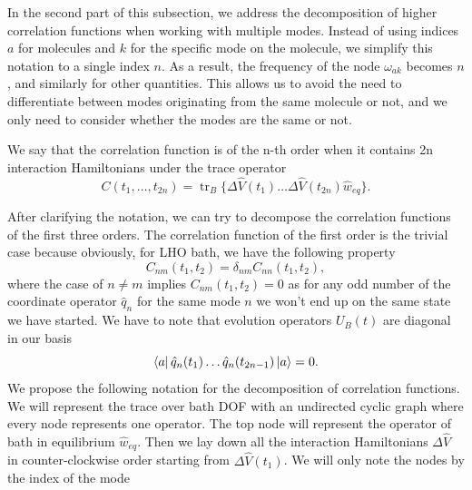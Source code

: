 In the second part of this subsection, we address the decomposition of higher correlation functions when working with multiple modes. Instead of using indices $a$ for molecules and $k$ for the specific mode on the molecule, we simplify this notation to a single index $n$. As a result, the frequency of the node $\omega_{ak}$ becomes $n$, and similarly for other quantities. This allows us to avoid the need to differentiate between modes originating from the same molecule or not, and we only need to consider whether the modes are the same or not. 


We say that the correlation function is of the n-th order when it contains 2n interaction Hamiltonians under the trace operator
\begin{equation}
    C(t_1, \ldots, t_{2n}) = \operatorname{tr}_B \big\{ \Delta \hat{V} (t_1) \ldots \Delta \hat{V} (t_{2n}) \hat{w}_{eq} \big\}.
\end{equation}

After clarifying the notation, we can try to decompose the correlation functions of the first three orders. The correlation function of the first order is the trivial case because obviously, for LHO bath, we have the following property
\begin{equation}
\label{corr_fun_1st_decompshow}
    C_{nm}(t_1, t_2) = \delta_{nm}C_{nn}(t_1, t_2),
\end{equation}
where the case of $n\neq m$ implies $C_{nm}(t_1, t_2) = 0$ as for any odd number of the coordinate operator $\hat{q}_n$ for the same mode $n$ we won't end up on the same state we have started. We have to note that evolution operators $U_B(t)$ are diagonal in our basis
\begin{equation}
    \bra{a} \hat{q}_n(t_1) \ldots \hat{q}_n(t_{2n-1}) \ket{a} = 0.
\end{equation}
We propose the following notation for the decomposition of correlation functions. We will represent the trace over bath DOF with an undirected cyclic graph where every node represents one operator. The top node will represent the operator of bath in equilibrium $\hat{w}_{eq}$. Then we lay down all the interaction Hamiltonians $\Delta \hat{V}$ in counter-clockwise order starting from $\Delta \hat{V}(t_1)$. We will only note the nodes by the index of the mode 

